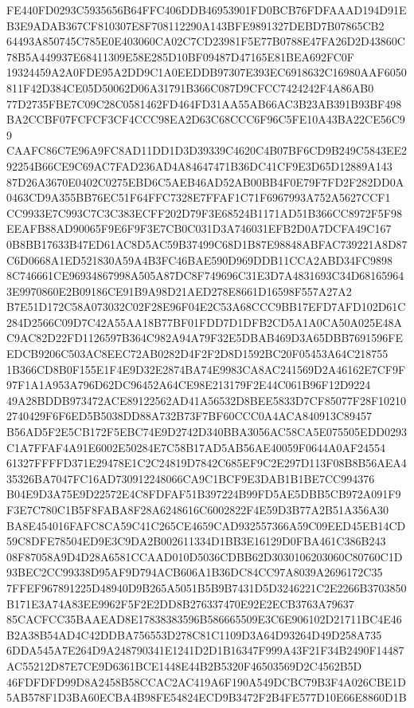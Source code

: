 \documentclass[UTF8,fontset=fandol,zihao=-4,a4paper]{ctexart}
\begin{document}
{{FE440FD0293C5935656B64FFC406DDB46953901FD0BCB76FDFAAAD194D91EB3E9ADAB367CF810307E8F708112290A143BFE9891327DEBD7B07865CB2
64493A850745C785E0E403060CA02C7CD23981F5E77B0788E47FA26D2D43860C78B5A449937E68411309E58E285D10BF09487D47165E81BEA692FC0F
19324459A2A0FDE95A2DD9C1A0EEDDB97307E393EC6918632C16980AAF6050811F42D384CE05D50062D06A31791B366C087D9CFCC7424242F4A86AB0
77D2735FBE7C09C28C0581462FD464FD31AA55AB66AC3B23AB391B93BF498BA2CCBF07FCFCF3CF4CCC98EA2D63C68CCC6F96C5FE10A43BA22CE56C99
CAAFC86C7E96A9FC8AD11DD1D3D39339C4620C4B07BF6CD9B249C5843EE292254B66CE9C69AC7FAD236AD4A84647471B36DC41CF9E3D65D12889A143
87D26A3670E0402C0275EBD6C5AEB46AD52AB00BB4F0E79F7FD2F282DD0A0463CD9A355BB76EC51F64FFC7328E7FFAF1C71F6967993A752A5627CCF1
CC9933E7C993C7C3C383ECFF202D79F3E68524B1171AD51B366CC8972F5F98EEAFB88AD90065F9E6F9F3E7CB0C031D3A746031EFB2D0A7DCFA49C167
0B8BB17633B47ED61AC8D5AC59B37499C68D1B87E98848ABFAC739221A8D87C6D0668A1ED521830A59A4B3FC46BAE590D969DDB11CCA2ABD34FC9898
8C746661CE96934867998A505A87DC8F749696C31E3D7A4831693C34D681659643E9970860E2B09186CE91B9A98D21AED278E8661D16598F557A27A2
B7E51D172C58A073032C02F28E96F04E2C53A68CCC9BB17EFD7AFD102D61C284D2566C09D7C42A55AA18B77BF01FDD7D1DFB2CD5A1A0CA50A025E48A
C9AC82D22FD1126597B364C982A94A79F32E5DBAB469D3A65DBB7691596FEEDCB9206C503AC8EEC72AB0282D4F2F2D8D1592BC20F05453A64C218755
1B366CD8B0F155E1F4E9D32E2874BA74E9983CA8AC241569D2A46162E7CF9F97F1A1A953A796D62DC96452A64CE98E213179F2E44C061B96F12D9224
49A28BDDB973472ACE89122562AD41A56532D8BEE5833D7CF85077F28F102102740429F6F6ED5B5038DD88A732B73F7BF60CCC0A4ACA840913C89457
B56AD5F2E5CB172F5EBC74E9D2742D340BBA3056AC58CA5E075505EDD0293C1A7FFAF4A91E6002E50284E7C58B17AD5AB56AE40059F0644A0AF24554
61327FFFFD371E29478E1C2C24819D7842C685EF9C2E297D113F08B8B56AEA435326BA7047FC16AD730912248066CA9C1BCF9E3DAB1B1BE7CC994376
B04E9D3A75E9D22572E4C8FDFAF51B397224B99FD5AE5DBB5CB972A091F9F3E7C780C1B5F8FABA8F28A6248616C6002822F4E59D3B77A2B51A356A30
BA8E454016FAFC8CA59C41C265CE4659CAD932557366A59C09EED45EB14CD59C8DFE78504ED9E3C9DA2B002611334D1BB3E16129D0FBA461C386B243
08F87058A9D4D28A6581CCAAD010D5036CDBB62D3030106203060C80760C1D93BEC2CC99338D95AF9D794ACB606A1B36DC84CC97A8039A2696172C35
7FFEF967891225D48940D9B265A5051B5B9B7431D5D3246221C2E2266B3703850B171E3A74A83EE9962F5F2E2DD8B276337470E92E2ECB3763A79637
85CACFCC35BAAEAD8E17838383596B586665509E3C6E906102D21711BC4E46B2A38B54AD4C42DDBA756553D278C81C1109D3A64D93264D49D258A735
6DDA545A7E264D9A248790341E1241D2D1B16347F999A43F21F34B2490F14487AC55212D87E7CE9D6361BCE1448E44B2B5320F46503569D2C4562B5D
46FDFDFD99D8A2458B58CCAC2AC419A6F190A549DCBC79B3F4A026CBE1D5AB578F1D3BA60ECBA4B98FE54824ECD9B3472F2B4FE577D10E66E8860D1B
}}
\end{document}
